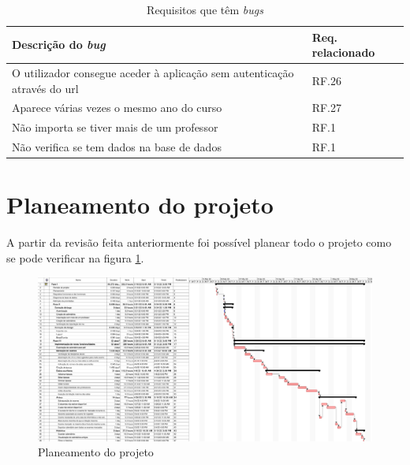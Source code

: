\documentclass[12pt, twoside]{report}
\begin{document}
		\begin{table}[H]
		\caption{Requisitos que têm \textit{bugs}}
		
		\begin{center}
			\begin{tabularx}{\textwidth}{|X|X|}
				\hline
				\textbf{Descrição do \textit{bug}} & \textbf{Req. relacionado} \\
				\hline
				O utilizador consegue aceder à aplicação sem autenticação através do url & RF.26\\
				\hline
				Aparece várias vezes o mesmo ano do curso & RF.27\\
				\hline
				Não importa se tiver mais de um professor & RF.1\\
				\hline
				Não verifica se tem dados na base de dados & RF.1\\
				\hline
			\end{tabularx}
			\label{revisaodaaplicacaobugs}
		\end{center}
	\end{table}
	
	\section{Planeamento do projeto}
	
	A partir da revisão feita anteriormente foi possível planear todo o projeto como se pode verificar na figura 
	\ref{planeamentoinicial}.
	
		\clearpage
	\begin{landscape}
		\pagestyle{empty}
		
		\begin{figure}[H] 
			\centering 			\includegraphics[width=1.4\textwidth,height=1.4\textheight,keepaspectratio]{image/planeamentoInicial}
			\caption{Planeamento do projeto}
			\label{planeamentoinicial}
			
		\end{figure}
		
		
	\end{landscape}
\end{document}

